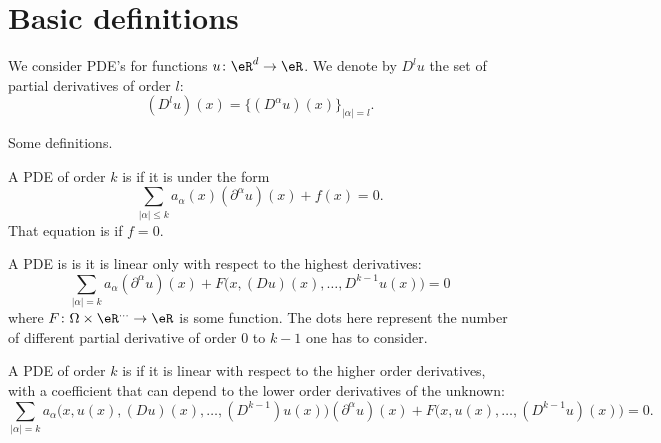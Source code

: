 
\section{Basic definitions}

We consider PDE's for functions \( u\colon \eR^d\to \eR\). We denote by \( D^lu\) the set of partial derivatives of order \( l\):
\begin{equation}
	(D^lu)(x)=\{ (D^{\alpha}u)(x) \}_{| \alpha |=l}.
\end{equation}

Some definitions.
\begin{definition}
	A PDE of order \( k\) is  if it is under the form
	\begin{equation}
		\sum_{| \alpha |\leq k}a_{\alpha}(x)(\partial^{\alpha}u)(x)+f(x)=0.
	\end{equation}
	That equation is  if \( f=0\).
\end{definition}

\begin{definition}
	A PDE is  is it is linear only with respect to the highest derivatives:
	\begin{equation}
		\sum_{| \alpha |=k}a_{\alpha}(\partial^{\alpha}u)(x)+F\big( x, (Du)(x),\ldots, D^{k-1}u(x) \big)=0
	\end{equation}
	where \( F\colon \Omega\times \eR^{\ldots}\to \eR\) is some function. The dots here represent the number of different partial derivative of order \( 0\) to \( k-1\) one has to consider.
\end{definition}

\begin{definition}
	A PDE of order \( k\) is  if it is linear with respect to the higher order derivatives, with a coefficient that can depend to the lower order derivatives of the unknown:
	\begin{equation}
		\sum_{| \alpha |=k}a_{\alpha}\big( x,u(x),(Du)(x),\ldots, (D^{k-1})u(x) \big)(\partial^{\alpha}u)(x)+F\big( x,u(x),\ldots, (D^{k-1}u)(x) \big)=0.
	\end{equation}
\end{definition}

